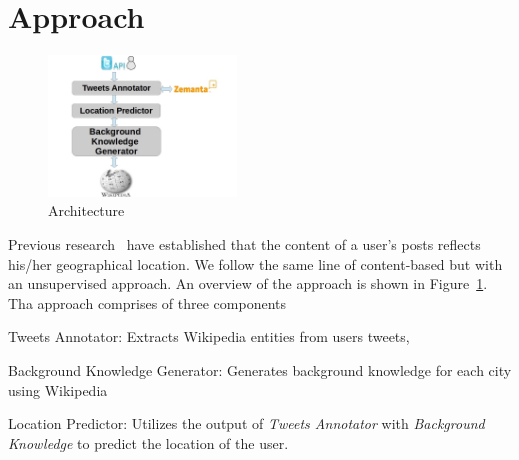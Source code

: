 
\section{Approach}
\label{sec:approach}
\begin{figure}
\centering
\includegraphics[width = 5cm]{images/architecture-2.jpg}
\caption{Architecture}
\label{fig:architecture}
\end{figure}
\vspace*{-1.00em}
Previous research~\cite{bo2012geolocation,cheng2010you} have established that the content of a user's posts reflects his/her geographical location. We follow the same line of content-based but with an unsupervised approach. An overview of the approach is shown in Figure~\ref{fig:architecture}. Tha approach comprises of three components \begin{inparaenum}[(1)]\item Tweets Annotator: Extracts Wikipedia entities from users tweets, \item Background Knowledge Generator: Generates background knowledge for each city using Wikipedia \item Location Predictor: Utilizes the output of \textit{Tweets Annotator} with \textit{Background Knowledge} to predict the location of the user. \end{inparaenum} 

